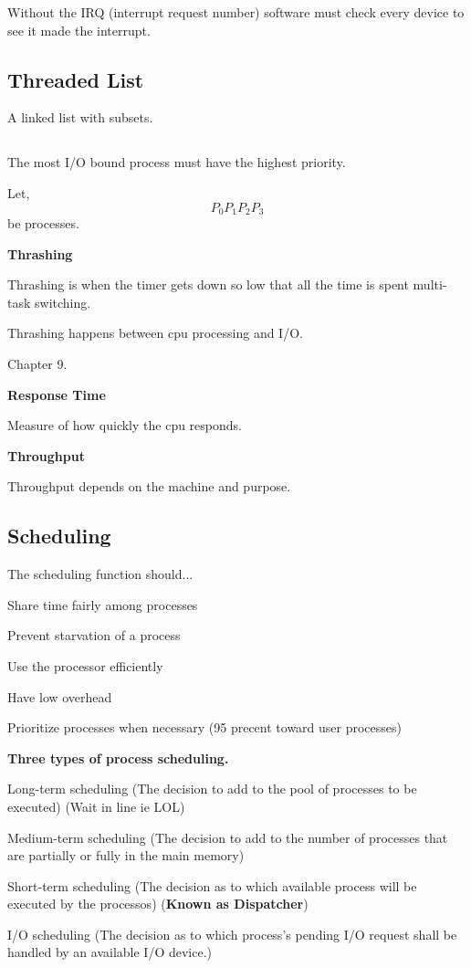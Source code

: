 \documentclass{article}
\begin{document}
Without the IRQ (interrupt request number) software must check every device to see it made the interrupt. 

\subsection*{Threaded List}

A linked list with subsets. 

\subsection*{}

The most I/O bound process must have the highest priority. 

Let,
$$
P_0
P_1
P_2
P_3
$$
be processes. 

{\bf Thrashing}

Thrashing is when the timer gets down so low that all the time is spent multi-task switching.

Thrashing happens between cpu processing and I/O. 

Chapter 9. 

{\bf Response Time}

Measure of how quickly the cpu responds. 

{\bf Throughput}

Throughput depends on the machine and purpose. 

\subsection*{Scheduling}

The scheduling function should...
\begin{description}
\item Share time fairly among processes
\item Prevent starvation of a process
\item Use the processor efficiently
\item Have low overhead
\item Prioritize processes when necessary (95 precent toward user processes)
\end{description}

{\bf Three types of process scheduling.}

\begin{description}
\item Long-term scheduling (The decision to add to the pool of processes to be executed) (Wait in line ie LOL)
\item Medium-term scheduling (The decision to add to the number of processes that are partially or fully in the main memory)
\item Short-term scheduling (The decision as to which available process will be executed by the processos) ({\bf Known as Dispatcher})
\item I/O scheduling (The decision as to which process's pending I/O request shall be handled by an available I/O device.)
\end{description}
\end{document}
